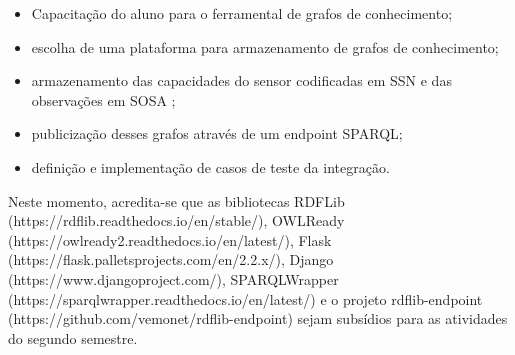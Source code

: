 \begin{itemize}
\item {Capacitação do aluno para o ferramental de grafos de conhecimento;}
\item {escolha de uma plataforma para armazenamento de grafos de conhecimento;}
\item {armazenamento das capacidades do sensor codificadas em SSN e das observações em SOSA \cite{JANOWICZ20191} \cite{Janowicz:17:SSN};}
\item{publicização desses grafos através de um endpoint SPARQL;}
\item{definição e implementação de casos de teste da integração.}
\end{itemize}

Neste momento, acredita-se que as bibliotecas RDFLib (https://rdflib.readthedocs.io/en/stable/), OWLReady (https://owlready2.readthedocs.io/en/latest/), Flask (https://flask.palletsprojects.com/en/2.2.x/), Django (https://www.djangoproject.com/), SPARQLWrapper (https://sparqlwrapper.readthedocs.io/en/latest/) e o projeto rdflib-endpoint (https://github.com/vemonet/rdflib-endpoint) sejam subsídios para as atividades do segundo semestre.


